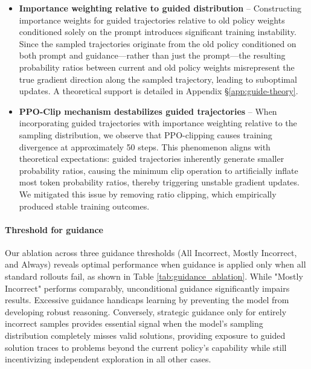 \documentclass{article}
\begin{document}
\begin{itemize}[leftmargin=2em]    
    
    \item \textbf{Importance weighting relative to guided distribution} -- Constructing importance weights for guided trajectories relative to old policy weights conditioned solely on the prompt introduces significant training instability. Since the sampled trajectories originate from the old policy conditioned on both prompt and guidance—rather than just the prompt—the resulting probability ratios between current and old policy weights misrepresent the true gradient direction along the sampled trajectory, leading to suboptimal updates. A theoretical support is detailed in Appendix \S \ref{app:guide-theory}.
    
    \item \textbf{PPO-Clip mechanism destabilizes guided trajectories} -- When incorporating guided trajectories with importance weighting relative to the sampling distribution, we observe that PPO-clipping causes training divergence at approximately 50 steps. This phenomenon aligns with theoretical expectations: guided trajectories inherently generate smaller probability ratios, causing the minimum clip operation to artificially inflate most token probability ratios, thereby triggering unstable gradient updates. We mitigated this issue by removing ratio clipping, which empirically produced stable training outcomes. 

\end{itemize}

\paragraph{Threshold for guidance} Our ablation across three guidance thresholds (All Incorrect, Mostly Incorrect, and Always) reveals optimal performance when guidance is applied only when all standard rollouts fail, as shown in Table \ref{tab:guidance_ablation}. While "Mostly Incorrect" performs comparably, unconditional guidance significantly impairs results. Excessive guidance handicaps learning by preventing the model from developing robust reasoning. Conversely, strategic guidance only for entirely incorrect samples provides essential signal when the model's sampling distribution completely misses valid solutions, providing exposure to guided solution traces to problems beyond the current policy's capability while still incentivizing independent exploration in all other cases.
\end{document}
